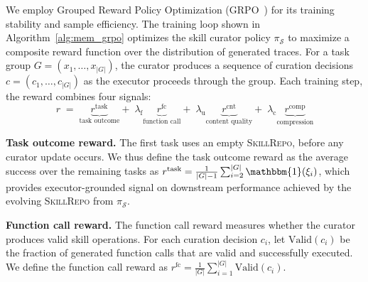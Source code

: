 We employ Grouped Reward Policy Optimization (GRPO~\cite{DBLP:journals/corr/abs-2402-03300}) for its training stability and sample efficiency. The training loop shown in Algorithm~\ref{alg:mem_grpo} optimizes the skill curator policy $\pi_{\mathcal{S}}$ to maximize a composite reward function over the distribution of generated traces. 
For a task group $G=(x_1,\dots,x_{|G|})$, the curator produces a sequence of curation decisions
$c=(c_1,\dots,c_{|G|})$ as the executor proceeds through the group. Each training step, the reward combines four signals:
\setlength{\abovedisplayskip}{0pt}
\setlength{\belowdisplayskip}{0pt}
\setlength{\abovedisplayshortskip}{0pt}
\setlength{\belowdisplayshortskip}{0pt}
\begin{equation}
    r \;=\; \underbrace{r^{\text{task}}}_{\text{task outcome}}
    + \;\lambda_{\mathrm{f}} \underbrace{r^{\text{fc}}}_{\text{function call}}
    + \;\lambda_{\mathrm{u}} \underbrace{r^{\text{cnt}}}_{\text{content quality}}
    + \;\lambda_{\mathrm{c}} \underbrace{r^{\text{comp}}}_{\text{compression}}
    \label{eq:reward}
\end{equation}

\noindent\textbf{Task outcome reward.}\;
The first task uses an empty \textsc{SkillRepo}, before any curator update occurs.
We thus define the task outcome reward as the average success over the remaining tasks as $r^{\text{task}}
    =
    \frac{1}{|G|-1}
    \sum_{i=2}^{|G|}
    \mathbbm{1}(\xi_i)$,
which provides executor-grounded signal on downstream performance achieved by the evolving \textsc{SkillRepo} from $\pi_{\mathcal{S}}$.

\noindent\textbf{Function call reward.}\;
The function call reward measures whether the curator produces valid skill operations. 
For each curation decision $c_i$, let $\mathrm{Valid}(c_i)$ be the fraction of generated function calls that are valid and successfully executed.
We define the function call reward as $r^{\text{fc}}
    =
    \frac{1}{|G|}
    \sum_{i=1}^{|G|}
    \mathrm{Valid}(c_i)$.


